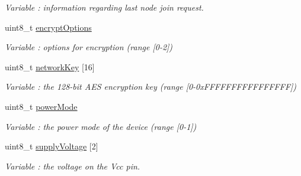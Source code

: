 \begin{DoxyCompactItemize}
\begin{DoxyCompactList}\small\item\em Variable \+: information regarding last node join request. \end{DoxyCompactList}\item 
uint8\+\_\+t \hyperlink{class_wasp_x_bee_z_b_ada3e0b058b63683c74bb58fa6f21b19d}{encrypt\+Options}\hypertarget{class_wasp_x_bee_z_b_ada3e0b058b63683c74bb58fa6f21b19d}{}\label{class_wasp_x_bee_z_b_ada3e0b058b63683c74bb58fa6f21b19d}

\begin{DoxyCompactList}\small\item\em Variable \+: options for encryption (range \mbox{[}0-\/2\mbox{]}) \end{DoxyCompactList}\item 
uint8\+\_\+t \hyperlink{class_wasp_x_bee_z_b_a6552264e7b7a423c00f3bcb9887978f6}{network\+Key} \mbox{[}16\mbox{]}\hypertarget{class_wasp_x_bee_z_b_a6552264e7b7a423c00f3bcb9887978f6}{}\label{class_wasp_x_bee_z_b_a6552264e7b7a423c00f3bcb9887978f6}

\begin{DoxyCompactList}\small\item\em Variable \+: the 128-\/bit A\+ES encryption key (range \mbox{[}0-\/0x\+F\+F\+F\+F\+F\+F\+F\+F\+F\+F\+F\+F\+F\+F\+FF\mbox{]}) \end{DoxyCompactList}\item 
uint8\+\_\+t \hyperlink{class_wasp_x_bee_z_b_a5ba4f2bc074e4e321e08e0def503c8cd}{power\+Mode}\hypertarget{class_wasp_x_bee_z_b_a5ba4f2bc074e4e321e08e0def503c8cd}{}\label{class_wasp_x_bee_z_b_a5ba4f2bc074e4e321e08e0def503c8cd}

\begin{DoxyCompactList}\small\item\em Variable \+: the power mode of the device (range \mbox{[}0-\/1\mbox{]}) \end{DoxyCompactList}\item 
uint8\+\_\+t \hyperlink{class_wasp_x_bee_z_b_ae017a8df747359ed3f27b8f22dd7e9d1}{supply\+Voltage} \mbox{[}2\mbox{]}\hypertarget{class_wasp_x_bee_z_b_ae017a8df747359ed3f27b8f22dd7e9d1}{}\label{class_wasp_x_bee_z_b_ae017a8df747359ed3f27b8f22dd7e9d1}

\begin{DoxyCompactList}\small\item\em Variable \+: the voltage on the Vcc pin. \end{DoxyCompactList}\end{DoxyCompactItemize}
